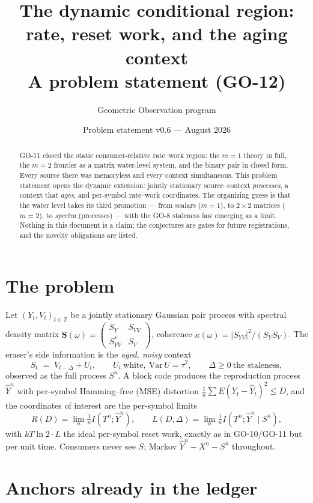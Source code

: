 ﻿\documentclass[11pt]{article}
\title{The dynamic conditional region: rate, reset work, and the aging
context\\[2pt]\large A problem statement (GO-12)}
\author{Geometric Observation program}
\date{Problem statement v0.6 --- August 2026}
\theoremstyle{remark}
\begin{document}
\maketitle

\begin{abstract}
GO-11 closed the static consumer-relative rate--work region: the $m=1$
theory in full, the $m=2$ frontier as a matrix water-level system, and
the binary pair in closed form. Every source there was memoryless and
every context simultaneous. This problem statement opens the dynamic
extension: jointly stationary source--context \emph{processes}, a
context that \emph{ages}, and per-symbol rate--work coordinates. The
organizing guess is that the water level takes its third promotion ---
from scalars ($m=1$), to $2\times2$ matrices ($m=2$), to \emph{spectra}
(processes) --- with the GO-8 staleness law emerging as a limit. Nothing
in this document is a claim; the conjectures are gates for future
registrations, and the novelty obligations are listed.
\end{abstract}

\section{The problem}

Let $(Y_t,V_t)_{t\in\mathbb Z}$ be a jointly stationary Gaussian pair
process with spectral density matrix
$\mathbf S(\omega)=\begin{pmatrix}S_Y&S_{YV}\\S_{YV}^*&S_V\end{pmatrix}$,
coherence $\kappa(\omega)=|S_{YV}|^2/(S_YS_V)$. The eraser's side
information is the \emph{aged, noisy} context
\[
S_t\;=\;V_{t-\Delta}+U_t,\qquad U_t\ \text{white},\ \mathrm{Var}\,U=
\tau^2,\qquad\Delta\ge0\ \text{the staleness},
\]
observed as the full process $S^n$. A block code produces the
reproduction process $\hat Y^n$ with per-symbol Hamming--free (MSE)
distortion $\tfrac1n\sum E(Y_t-\hat Y_t)^2\le D$, and the coordinates of
interest are the per-symbol limits
\[
R(D)=\lim_n\tfrac1n I(T^n;\hat Y^n),\qquad
L(D,\Delta)=\lim_n\tfrac1n I(T^n;\hat Y^n\mid S^n),
\]
with $kT\ln2\cdot L$ the ideal per-symbol reset work, exactly as in
GO-10/GO-11 but per unit time. Consumers never see $S$; Markov
$\hat Y^n-X^n-S^n$ throughout.

\section{Anchors already in the ledger}
\end{document}
